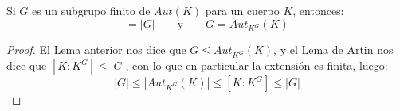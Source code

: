 \begin{teo}
    Si $G$ es un subgrupo finito de $Aut(K)$ para un cuerpo $K$, entonces:
    \begin{equation*}
        [K:K^G] = |G| \qquad \text{y}\qquad G = Aut_{K^G}(K)
    \end{equation*}
    \begin{proof}
        El Lema anterior nos dice que $G\leq Aut_{K^G}(K)$, y el Lema de Artin nos dice que $[K:K^G]\leq |G|$, con lo que en particular la extensión es finita, luego:
        \begin{equation*}
            |G| \leq |Aut_{K^G}(K)| \leq [K:K^G] \leq |G|
        \end{equation*}
    \end{proof}
\end{teo}

